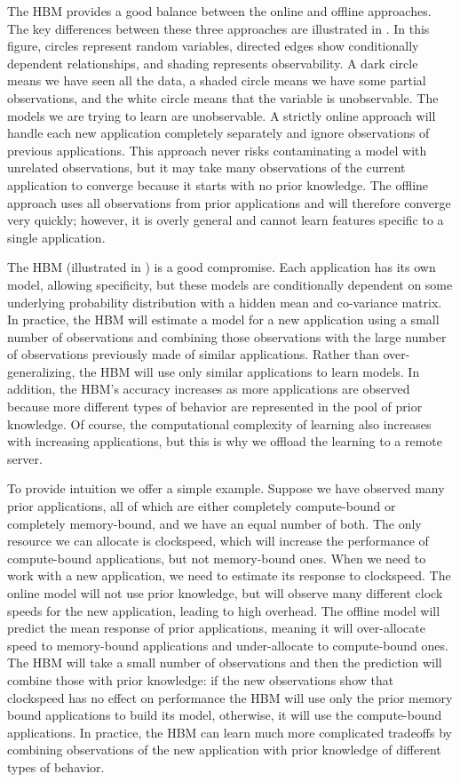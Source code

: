 The HBM provides a good balance between the online and offline
approaches.  The key differences between these three approaches are
illustrated in . In this figure, circles
represent random variables, directed edges show conditionally
dependent relationships, and shading represents observability.  A dark
circle means we have seen all the data, a shaded circle means we have
some partial observations, and the white circle means that the
variable is unobservable.  The models we are trying to learn
are unobservable.  A strictly online approach will handle each new
application completely separately and ignore observations of previous
applications.  This approach never risks contaminating a model with
unrelated observations, but it may take many observations of the
current application to converge because it starts with no prior
knowledge. The offline approach uses all observations from prior
applications and will therefore converge very quickly; however, it is
overly general and cannot learn features specific to a single
application.

The HBM (illustrated in ) is a good compromise.  Each
application has its own model, allowing specificity, but these models
are conditionally dependent on some underlying probability
distribution with a hidden mean and co-variance matrix.  In practice,
the HBM will estimate a model for a new application using a small
number of observations and combining those observations with the large
number of observations previously made of similar applications.
Rather than over-generalizing, the HBM will use only similar
applications to learn models.  In addition, the HBM's accuracy
increases as more applications are observed because more different
types of behavior are represented in the pool of prior knowledge.  Of
course, the computational complexity of learning also increases with
increasing applications, but this is why we offload the learning to a
remote server.

To provide intuition we offer a simple example.  Suppose we have
observed many prior applications, all of which are either completely
compute-bound or completely memory-bound, and we have an equal number
of both.  The only resource we can allocate is clockspeed, which will
increase the performance of compute-bound applications, but not
memory-bound ones.  When we need to work with a new application, we
need to estimate its response to clockspeed.  The online model will
not use prior knowledge, but will observe many different clock speeds
for the new application, leading to high overhead.  The offline model
will predict the mean response of prior applications, meaning it will
over-allocate speed to memory-bound applications and under-allocate to
compute-bound ones.  The HBM will take a small number of observations
and then the prediction will combine those with prior knowledge: if
the new observations show that clockspeed has no effect on performance
the HBM will use only the prior memory bound applications to build its
model, otherwise, it will use the compute-bound applications.  In
practice, the HBM can learn much more complicated tradeoffs by
combining observations of the new application with prior knowledge of
different types of behavior.



